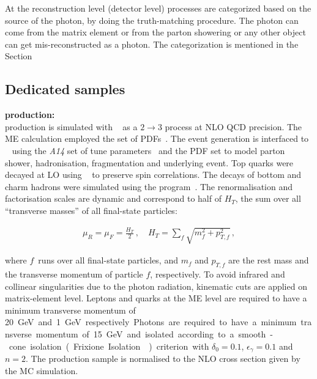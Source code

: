 At the reconstruction level (detector level) processes are categorized based on the source of the photon, by doing the truth-matching procedure. The photon can come from the matrix element or from the parton showering or any other object can get mis-reconstructed as a photon. The categorization is mentioned in the Section %

\subsection{Dedicated samples}
\label{sec:dedicated-samples}
\textbf{\tty production:}\\
\tty production is simulated with \MGNLO[2.7.3]~\cite{Alwall:2014hca} as a $2\to 3$ process at NLO QCD precision. The ME calculation employed the \NNPDF[3.0nlo] set of PDFs~\cite{Ball:2014uwa}. The event generation is interfaced to \PYTHIA[8.240]~\cite{Sjostrand:2007gs} using the \emph{A14} set of tune parameters~\cite{ATL-PHYS-PUB-2014-021} and the \nnpdflo PDF set to model parton shower, hadronisation, fragmentation and underlying event. Top quarks were decayed at LO using \MADSPIN~\cite{Frixione:2007zp,Artoisenet:2012st} to preserve spin correlations. The decays of bottom and charm hadrons were simulated using the \EVTGEN[1.6.0] program~\cite{Lange:2001uf}. The renormalisation and factorisation scales are dynamic and correspond to half of $H_{T}$, the sum over all \enquote{transverse masses} of all final-state particles:

\begin{align}\label{eq:HT}
  \mu_R = \mu_F = \frac{H_{T}}{2} \, , \quad 
  H_{T} = \sum_f \sqrt{ m_f^2 + p_{T,f}^2 } \, ,
\end{align}

where $f$~runs over all final-state particles, and $m_f$ and $p_{T,f}$ are the rest mass and the transverse momentum of particle $f$, respectively. To avoid infrared and collinear singularities due to the photon radiation, kinematic cuts are applied on matrix-element level. Leptons and quarks at the ME level are required to have a minimum transverse momentum of \SI{20} GeV and \SI{1} GeV respectively. Photons are required to have a minimum transverse momentum of 15 GeV and isolated according to a smooth-cone isolation (Frixione Isolation~\cite{Frixione:1998jh}) criterion with $\delta_0=0.1$, $\epsilon_{\gamma}=0.1$ and $n=2$. The \tty production sample is normalised to the NLO cross section given by the MC simulation.

